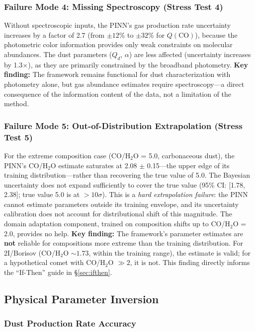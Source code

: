 \documentclass[preprint2]{aastex631}
\begin{document}
\subsubsection{Failure Mode 4: Missing Spectroscopy (Stress Test 4)}

Without spectroscopic inputs, the PINN's gas production rate uncertainty increases by a factor of 2.7 (from $\pm 12\%$ to $\pm 32\%$ for $Q(\text{CO})$), because the photometric color information provides only weak constraints on molecular abundances. The dust parameters ($Q_d$, $\alpha$) are less affected (uncertainty increases by 1.3$\times$), as they are primarily constrained by the broadband photometry. \textbf{Key finding:} The framework remains functional for dust characterization with photometry alone, but gas abundance estimates require spectroscopy---a direct consequence of the information content of the data, not a limitation of the method.

\subsubsection{Failure Mode 5: Out-of-Distribution Extrapolation (Stress Test 5)}

For the extreme composition case (CO/H$_2$O = 5.0, carbonaceous dust), the PINN's CO/H$_2$O estimate saturates at 2.08 $\pm$ 0.15---the upper edge of its training distribution---rather than recovering the true value of 5.0. The Bayesian uncertainty does not expand sufficiently to cover the true value (95\% CI: [1.78, 2.38]; true value 5.0 is at $>10\sigma$). This is a \textit{hard extrapolation failure}: the PINN cannot estimate parameters outside its training envelope, and its uncertainty calibration does not account for distributional shift of this magnitude. The domain adaptation component, trained on composition shifts up to CO/H$_2$O = 2.0, provides no help. \textbf{Key finding:} The framework's parameter estimates are \textbf{not} reliable for compositions more extreme than the training distribution. For 2I/Borisov (CO/H$_2$O $\sim 1.73$, within the training range), the estimate is valid; for a hypothetical comet with CO/H$_2$O $\gg 2$, it is not. This finding directly informs the ``If-Then'' guide in \S\ref{sec:ifthen}.

\subsection{Physical Parameter Inversion}

\subsubsection{Dust Production Rate Accuracy}
\end{document}
